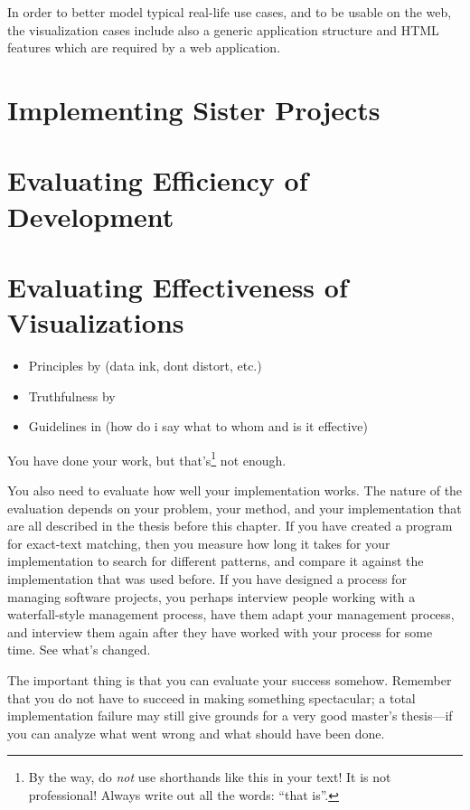 In order to better model typical real-life use cases, and to be usable on the web, the visualization cases include also a generic application structure and HTML features  which are required by a web application.

\section{Implementing Sister Projects}

\section{Evaluating Efficiency of Development}

\section{Evaluating Effectiveness of Visualizations}

\begin{itemize}
	\item Principles by \citet{tufte_visual_1986} (data ink, dont distort, etc.)
	\item Truthfulness by \citet{azzam_j-b_2013}
	\item Guidelines in \citet{kraak_cartographic_1998} (how do i say what to whom and is it effective)
\end{itemize}

You have done your work, but that's\footnote{By the way, do \emph{not} use
shorthands like this in your text! It is not professional! Always write out all
the words: ``that is''.} not enough. 

You also need to evaluate how well your implementation works.  The
nature of the evaluation depends on your problem, your method, and
your implementation that are all described in the thesis before this
chapter.  If you have created a program for exact-text matching, then
you measure how long it takes for your implementation to search for
different patterns, and compare it against the implementation that was
used before.  If you have designed a process for managing software
projects, you perhaps interview people working with a waterfall-style
management process, have them adapt your management process, and
interview them again after they have worked with your process for some
time. See what's changed.

The important thing is that you can evaluate your success somehow.
Remember that you do not have to succeed in making something spectacular; a
total implementation failure may still give grounds for a very good master's
thesis---if you can analyze what went wrong and what should have been done.

 
